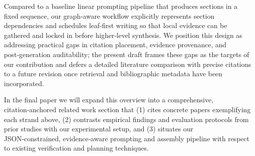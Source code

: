 Compared to a baseline linear prompting pipeline that produces sections in a fixed sequence, our graph‑aware workflow explicitly represents section dependencies and schedules leaf‑first writing so that local evidence can be gathered and locked in before higher‑level synthesis. We position this design as addressing practical gaps in citation placement, evidence provenance, and post‑generation auditability; the present draft frames these gaps as the targets of our contribution and defers a detailed literature comparison with precise citations to a future revision once retrieval and bibliographic metadata have been incorporated.

In the final paper we will expand this overview into a comprehensive, citation‑anchored related work section that (1) cites concrete papers exemplifying each strand above, (2) contrasts empirical findings and evaluation protocols from prior studies with our experimental setup, and (3) situates our JSON‑constrained, evidence‑aware prompting and assembly pipeline with respect to existing verification and planning techniques.